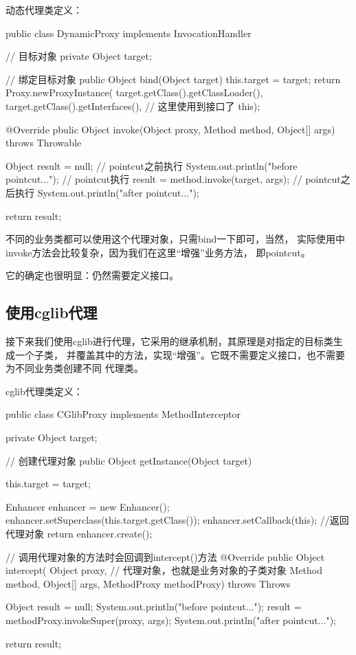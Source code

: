 \documentclass[a4paper,11pt]{article}
\begin{document}
动态代理类定义：

\begin{javacode}
public class DynamicProxy implements InvocationHandler {
  // 目标对象
  private Object target;

  // 绑定目标对象
  public Object bind(Object target) {
    this.target = target;
    return Proxy.newProxyInstance(
           target.getClass().getClassLoader(),
           target.getClass().getInterfaces(), // 这里使用到接口了
           this);
  }

  @Override
  pbulic Object invoke(Object proxy, Method method, Object[] args)
                throws Throwable {
    Object result = null;
    // pointcut之前执行
    System.out.println("before pointcut...");
    // pointcut执行
    result = method.invoke(target, args);
    // pointcut之后执行
    System.out.println("after pointcut...");

    return result;
  }
}
\end{javacode}

不同的业务类都可以使用这个代理对象，只需bind一下即可，当然，
实际使用中invoke方法会比较复杂，因为我们在这里“增强”业务方法，
即pointcut。

它的确定也很明显：仍然需要定义接口。

\subsection[使用cglib代理]{使用cglib代理}
接下来我们使用cglib进行代理，它采用的继承机制，其原理是对指定的目标类生成一个子类，
并覆盖其中的方法，实现“增强”。它既不需要定义接口，也不需要为不同业务类创建不同
代理类。

cglib代理类定义：

\begin{javacode}
public class CGlibProxy implements MethodInterceptor {
  private Object target;

  // 创建代理对象
  public Object getInstance(Object target) {
    this.target = target;
    
    Enhancer enhancer = new Enhancer();
    enhancer.setSuperclass(this.target.getClass());
    enhancer.setCallback(this);
    //返回代理对象
    return enhancer.create();
  }

  // 调用代理对象的方法时会回调到intercept()方法
  @Override
  public Object intercept(
         Object proxy, // 代理对象，也就是业务对象的子类对象
         Method method,
         Object[] args,
         MethodProxy methodProxy) throws Throws {
    Object result = null;
    System.out.println("before pointcut...");
    result = methodProxy.invokeSuper(proxy, args);
    System.out.println("after pointcut...");

    return result;
  }
}
\end{javacode}
\end{document}
